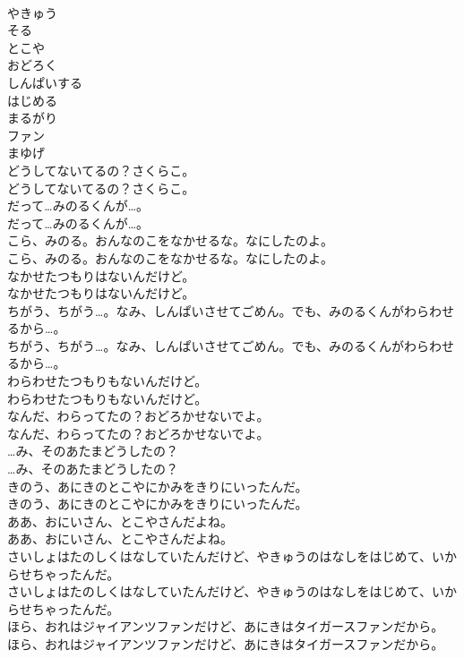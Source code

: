 \documentclass[8pt]{extreport}
\begin{document}
\begin{CJK}{UTF8}{min}
\\	やきゅう
\\	そる
\\	とこや
\\	おどろく
\\	しんぱいする
\\	はじめる
\\	まるがり
\\	ファン
\\	まゆげ
\\	どうしてないてるの？さくらこ。
\\	どうしてないてるの？さくらこ。
\\	だって…みのるくんが…。
\\	だって…みのるくんが…。
\\	こら、みのる。おんなのこをなかせるな。なにしたのよ。
\\	こら、みのる。おんなのこをなかせるな。なにしたのよ。
\\	なかせたつもりはないんだけど。
\\	なかせたつもりはないんだけど。
\\	ちがう、ちがう…。なみ、しんぱいさせてごめん。でも、みのるくんがわらわせるから…。
\\	ちがう、ちがう…。なみ、しんぱいさせてごめん。でも、みのるくんがわらわせるから…。
\\	わらわせたつもりもないんだけど。
\\	わらわせたつもりもないんだけど。
\\	なんだ、わらってたの？おどろかせないでよ。
\\	なんだ、わらってたの？おどろかせないでよ。
\\	…み、そのあたまどうしたの？
\\	…み、そのあたまどうしたの？
\\	きのう、あにきのとこやにかみをきりにいったんだ。
\\	きのう、あにきのとこやにかみをきりにいったんだ。
\\	ああ、おにいさん、とこやさんだよね。
\\	ああ、おにいさん、とこやさんだよね。
\\	さいしょはたのしくはなしていたんだけど、やきゅうのはなしをはじめて、いからせちゃったんだ。
\\	さいしょはたのしくはなしていたんだけど、やきゅうのはなしをはじめて、いからせちゃったんだ。
\\	ほら、おれはジャイアンツファンだけど、あにきはタイガースファンだから。
\\	ほら、おれはジャイアンツファンだけど、あにきはタイガースファンだから。

\end{CJK}
\end{document}
